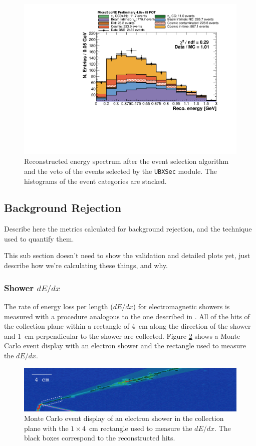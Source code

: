 \begin{figure}[htbp]
\centering
  \includegraphics[width=0.55\linewidth]{figures/h_fixed_energy.pdf}
  \caption{Reconstructed energy spectrum after the event selection algorithm and the veto of the events selected by the \texttt{UBXSec} module. The histograms of the event categories are stacked.}
  \label{fig:spectrum}
\end{figure}

\subsection{Background Rejection}
Describe here the metrics calculated for background rejection, and the technique used to quantify them.

This sub section doesn't need to show the validation and detailed plots yet, just describe how we're calculating these things, and why.


\subsubsection{Shower $dE/dx$}
The rate of energy loss per length ($dE/dx$) for electromagnetic showers is measured with a procedure analogous to the one described in \cite{argoneut}. All of the hits of the collection plane within a rectangle of 4~cm along the direction of the shower and 1~cm perpendicular to the shower are collected. Figure \ref{fig:evddedx} shows a Monte Carlo event display with an electron shower and the rectangle used to measure the $dE/dx$.

\begin{figure}[htbp]
\centering
  \includegraphics[width=0.9\linewidth]{figures/evddedx.png}
  \caption{Monte Carlo event display of an electron shower in the collection plane with the $1\times4$~cm rectangle used to measure the $dE/dx$. The black boxes correspond to the reconstructed hits.}
  \label{fig:evddedx}
\end{figure}

